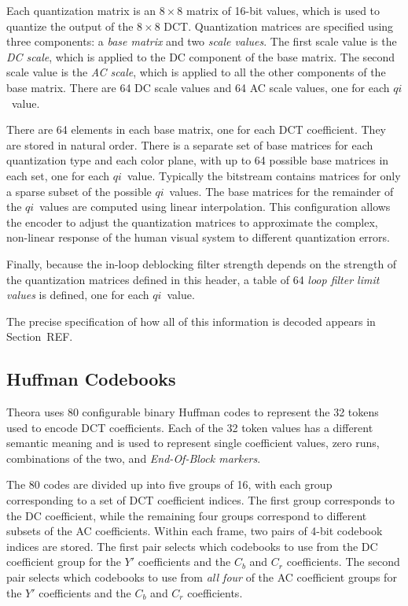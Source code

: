 \documentclass[11pt,letterpaper]{book}
\newcommand{\idx}[1]{{\ensuremath{\mathit{#1}}}}
\newcommand{\qi}{\idx{qi}}
\newcommand{\term}[1]{{\em #1}}
\numberwithin{equation}{chapter}
\numberwithin{figure}{chapter}
\numberwithin{table}{chapter}
\begin{document}
Each quantization matrix is an $8\times 8$ matrix of 16-bit values, which is
 used to quantize the output of the $8\times 8$ DCT\@.
Quantization matrices are specified using three components: a
 \term{base matrix} and two \term{scale values}.
The first scale value is the \term{DC scale}, which is applied to the DC
 component of the base matrix.
The second scale value is the \term{AC scale}, which is applied to all the
 other components of the base matrix.
There are 64 DC scale values and 64 AC scale values, one for each \qi\ value.

There are 64 elements in each base matrix, one for each DCT coefficient.
They are stored in natural order.
There is a separate set of base matrices for each quantization type and each
 color plane, with up to 64 possible base matrices in each set, one for each
 \qi\ value.
Typically the bitstream contains matrices for only a sparse subset of the
 possible \qi\ values.
The base matrices for the remainder of the \qi\ values are computed using
 linear interpolation.
This configuration allows the encoder to adjust the quantization matrices to
 approximate the complex, non-linear response of the human visual system to
 different quantization errors.

Finally, because the in-loop deblocking filter strength depends on the strength
 of the quantization matrices defined in this header, a table of 64 \term{loop
 filter limit values} is defined, one for each \qi\ value.

The precise specification of how all of this information is decoded appears in
 Section~REF.

\subsection{Huffman Codebooks}

Theora uses 80 configurable binary Huffman codes to represent the 32 tokens
 used to encode DCT coefficients.
Each of the 32 token values has a different semantic meaning and is used to
 represent single coefficient values, zero runs, combinations of the two, and
 \term{End-Of-Block markers}.

The 80 codes are divided up into five groups of 16, with each group
 corresponding to a set of DCT coefficient indices.
The first group corresponds to the DC coefficient, while the remaining four
 groups correspond to different subsets of the AC coefficients.
Within each frame, two pairs of 4-bit codebook indices are stored.
The first pair selects which codebooks to use from the DC coefficient group for
 the $Y'$ coefficients and the $C_b$ and $C_r$ coefficients.
The second pair selects which codebooks to use from {\em all four} of the AC
 coefficient groups for the $Y'$ coefficients and the $C_b$ and $C_r$
 coefficients.
\end{document}
